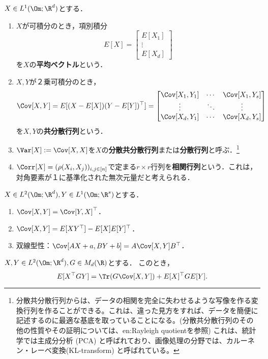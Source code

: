 \documentclass[uplatex,dvipdfmx]{jsreport}
\begin{document}
\begin{definition}
    $X\in L^1(\Om;\R^d)$とする．
    \begin{enumerate}
        \item $X$が可積分のとき，項別積分
        \[E[X]=\begin{bmatrix}
            E[X_1]\\\vdots\\E[X_d]
        \end{bmatrix}\]
        を$X$の\textbf{平均ベクトル}という．
        \item $X,Y$が２乗可積分のとき，
        \[\Cov[X,Y]=E[(X-E[X])(Y-E[Y])^\top]=\begin{bmatrix}
            \Cov[X_1,Y_1]&\cdots&\Cov[X_1,Y_s]\\
            \vdots&\ddots&\vdots\\
            \Cov[X_d,Y_1]&\cdots&\Cov[X_d,Y_s]
        \end{bmatrix}\]
        を$X,Y$の\textbf{共分散行列}という．
        \item $\Var[X]:=\Cov[X,X]$を$X$の\textbf{分散共分散行列}または\textbf{分散行列}と呼ぶ．\footnote{分散共分散行列からは、データの相関を完全に失わせるような写像を作る変換行列を作ることができる。これは、違った見方をすれば、データを簡便に記述するのに最適な基底を取っていることになる。(分散共分散行列のその他の性質やその証明については、en:Rayleigh quotientを参照) これは、統計学では主成分分析 (PCA) と呼ばれており、画像処理の分野では、カルーネン・レーベ変換(KL-transform) と呼ばれている。}
        \item $\Corr[X]=(\rho(X_i,X_j))_{i,j\in[n]}$で定まる$r\times r$行列を\textbf{相関行列}という．これは，対角要素が１に基準化された無次元量だと考えられる．
    \end{enumerate}
\end{definition}

\begin{proposition}[多次元分散の性質]
    $X\in L^2(\Om;\R^d),Y\in L^1(\Om;\R^s)$とする．
    \begin{enumerate}
        \item $\Cov[X,Y]=\Cov[Y,X]^\top$．
        \item $\Cov[X,Y]=E[XY^\top]-E[X]E[Y]^\top$．
        \item 双線型性：$\Cov[AX+a,BY+b]=A\Cov[X,Y]B^\top$．
    \end{enumerate}
\end{proposition}

\begin{proposition}
    $X,Y\in L^2(\Om;\R^d),G\in M_d(\R)$とする．
    このとき，
    \[E[X^\top GY]=\Tr(G\Cov[X,Y])+E[X]^\top GE[Y].\]
\end{proposition}
\end{document}
